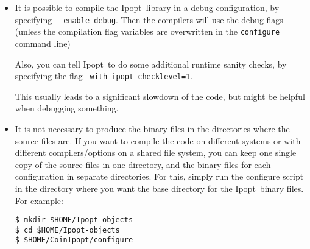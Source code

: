 \documentclass[10pt]{article}
\newcommand{\Ipopt}{{\sc Ipopt}}
\begin{document}
\begin{itemize}

\item It is possible to compile the \Ipopt\ library in a debug
  configuration, by specifying \verb|--enable-debug|.  Then the
  compilers will use the debug flags (unless the compilation flag
  variables are overwritten in the {\tt configure} command line)

  Also, you can tell \Ipopt\ to do some additional runtime sanity
  checks, by specifying the flag {\tt --with-ipopt-checklevel=1}.

  This usually leads to a significant slowdown of the code, but might
  be helpful when debugging something.

\item It is not necessary to produce the binary files in the
  directories where the source files are.  If you want to compile the
  code on different systems or with different compilers/options on a
  shared file system, you can keep one single copy of the source files
  in one directory, and the binary files for each configuration in
  separate directories.  For this, simply run the configure script in
  the directory where you want the base directory for the \Ipopt\
  binary files.  For example:

  {\tt \$ mkdir \$HOME/Ipopt-objects}\\
  {\tt \$ cd \$HOME/Ipopt-objects}\\
  {\tt \$ \$HOME/CoinIpopt/configure}

\end{itemize}

%
%

\end{document}
